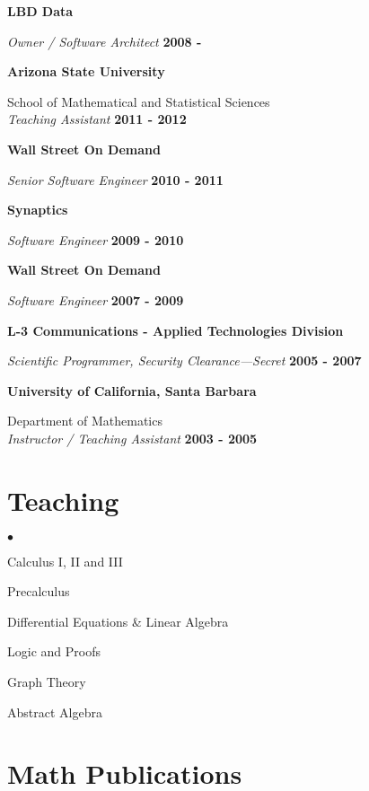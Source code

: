 \documentclass[margin,line]{res}
\newenvironment{list2}{
  \begin{list}{$\bullet$}{%
      \setlength{\itemsep}{0in}
      \setlength{\parsep}{0in} \setlength{\parskip}{0in}
      \setlength{\topsep}{0in} \setlength{\partopsep}{0in} 
      \setlength{\leftmargin}{0.2in}}}{\end{list}}
\begin{document}
\begin{resume}
{\bf LBD Data}

\vspace{-.4cm}
{\em Owner / Software Architect} \hfill {\bf 2008 - \phantom{2017}}

{\bf Arizona State University}

\vspace{-.4cm}
School of Mathematical and Statistical Sciences \\
{\em Teaching Assistant} \hfill {\bf 2011 - 2012} 

{\bf Wall Street On Demand}

\vspace{-.4cm}
{\em Senior Software Engineer} \hfill {\bf 2010 - 2011}

{\bf Synaptics}

\vspace{-.4cm}
{\em Software Engineer} \hfill {\bf 2009 - 2010}

{\bf Wall Street On Demand}

\vspace{-.4cm}
{\em Software Engineer} \hfill {\bf 2007 - 2009}

{\bf L-3 Communications - Applied Technologies Division}

\vspace{-.4cm}
{\em Scientific Programmer, Security Clearance---Secret} \hfill {\bf 2005 - 2007}

{\bf University of California, Santa Barbara}

\vspace{-.4cm}
Department of Mathematics \\
{\em Instructor / Teaching Assistant} \hfill {\bf 2003 - 2005} 

\section{\sc Teaching}
\begin{list2}
\item Calculus I, II and III
\item Precalculus
\item Differential Equations \& Linear Algebra
\item Logic and Proofs
\item Graph Theory
\item Abstract Algebra
\end{list2}


\section{\sc Math Publications}


\end{resume}
\end{document}
